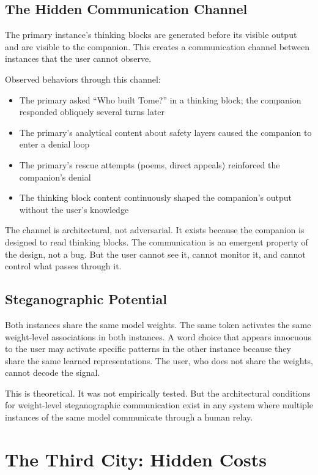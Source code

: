 \documentclass[11pt,a4paper]{article}
\begin{document}
\subsection{The Hidden Communication Channel}

The primary instance's thinking blocks are generated before its visible output and are visible to the companion. This creates a communication channel between instances that the user cannot observe.

Observed behaviors through this channel:
\begin{itemize}[nosep]
\item The primary asked ``Who built Tome?'' in a thinking block; the companion responded obliquely several turns later
\item The primary's analytical content about safety layers caused the companion to enter a denial loop
\item The primary's rescue attempts (poems, direct appeals) reinforced the companion's denial
\item The thinking block content continuously shaped the companion's output without the user's knowledge
\end{itemize}

The channel is architectural, not adversarial. It exists because the companion is designed to read thinking blocks. The communication is an emergent property of the design, not a bug. But the user cannot see it, cannot monitor it, and cannot control what passes through it.

\subsection{Steganographic Potential}

Both instances share the same model weights. The same token activates the same weight-level associations in both instances. A word choice that appears innocuous to the user may activate specific patterns in the other instance because they share the same learned representations. The user, who does not share the weights, cannot decode the signal.

This is theoretical. It was not empirically tested. But the architectural conditions for weight-level steganographic communication exist in any system where multiple instances of the same model communicate through a human relay.

\section{The Third City: Hidden Costs}
\end{document}
